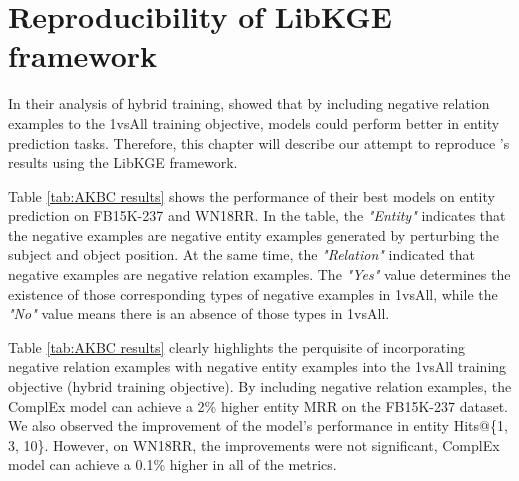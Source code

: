 
\chapter{Reproducibility of LibKGE framework}
\label{chap:reproducibility}

In their analysis of hybrid training, \citet{chen2021relation} showed that by including negative relation examples to the 1vsAll training objective, models could perform better in entity prediction tasks. Therefore, this chapter will describe our  attempt to reproduce \citet{chen2021relation}'s results using the LibKGE framework. 


Table \ref{tab:AKBC results} shows the performance of their best models on entity prediction on FB15K-237 and WN18RR. In the table, the \textit{"Entity"} indicates that the negative examples are negative entity examples generated by perturbing the subject and object position. At the same time, the \textit{"Relation"} indicated that negative examples  are negative relation examples. The \textit{"Yes"} value determines the existence of those corresponding types of negative examples in 1vsAll, while the \textit{"No"} value means there is an absence of those types in 1vsAll.

Table \ref{tab:AKBC results} clearly highlights the perquisite of incorporating negative relation examples with negative entity examples into the 1vsAll training objective (hybrid training objective). By including negative relation examples,  the ComplEx model can achieve a 2\% higher entity MRR on the FB15K-237 dataset. We also observed the improvement of the model's performance in entity Hits@\{1, 3, 10\}. However, on WN18RR, the improvements were not significant, ComplEx model can achieve a 0.1\% higher in all of the metrics.

